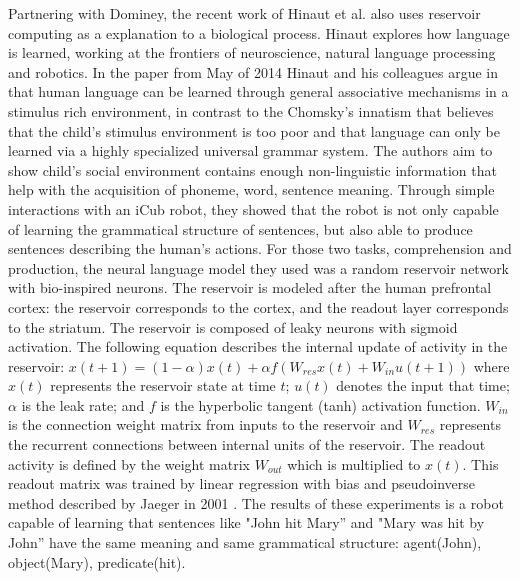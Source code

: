 \documentclass[12pt,oneside]{CUNY_CS_PhD}
\begin{document}
Partnering with Dominey, the recent work of Hinaut et al. \cite{hinaut_2012, hinaut_exploring_2014} also uses reservoir computing as a explanation to a biological process. Hinaut explores how language is learned, working at the frontiers of neuroscience, natural language processing and robotics. In the paper from May of 2014 \cite{hinaut_exploring_2014} Hinaut and his colleagues argue in that human language can be learned through general associative mechanisms in a stimulus rich environment, in contrast to the Chomsky's innatism that believes that the child's stimulus environment is too poor and that language can only be learned via a highly specialized universal grammar system.  The authors aim to show child's social environment contains enough non-linguistic information that help with the acquisition of phoneme, word, sentence meaning. Through simple interactions with an iCub robot, they showed that the robot is not only capable of learning the grammatical structure of sentences, but also able to produce sentences describing the human's actions. For those two tasks, comprehension and production, the neural language model they used was a random reservoir network with bio-inspired neurons. The reservoir is modeled after the human prefrontal cortex: the reservoir corresponds to the cortex, and the readout layer corresponds to the striatum. The reservoir is composed of leaky neurons with sigmoid activation. The following equation describes the internal update of activity in the reservoir: $x(t + 1) = (1 − \alpha)x(t) + \alpha f (W_{res}x(t ) + W_{in}u(t + 1))$ where $x(t)$ represents the reservoir state at time $t$; $u(t)$ denotes the input that time;$\alpha$ is the leak rate; and $f$ is the hyperbolic tangent (tanh) activation function. $W_{in}$ is the connection weight matrix from inputs to the reservoir and $W_{res}$ represents the recurrent connections between internal units of the reservoir. The readout activity is defined by the weight matrix $W_{out}$ which is multiplied to $x(t)$. This readout matrix was trained by linear regression with bias and pseudoinverse method described by Jaeger in 2001 \cite{jaeger_echo_2001}. The results of these experiments is a robot capable of learning that sentences like "John hit Mary'' and "Mary was hit by John'' have the same meaning and same grammatical structure: agent(John), object(Mary), predicate(hit).
\end{document}
